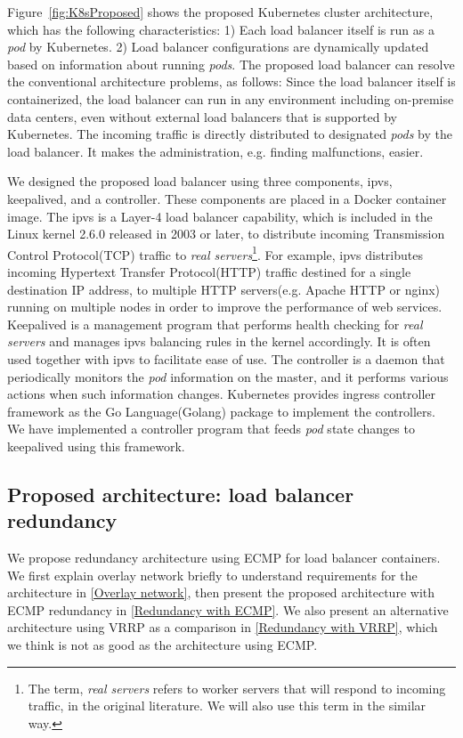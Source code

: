 Figure~\ref{fig:K8sProposed} shows the proposed  Kubernetes cluster architecture, 
which has the following characteristics:
1) Each load balancer itself is run as a {\em pod} by Kubernetes. 
2) Load balancer configurations are dynamically updated based on information about running {\em pods}.
The proposed load balancer can resolve the conventional architecture problems, as follows:
Since the load balancer itself is containerized, the load balancer can run in any environment including on-premise data centers, 
even without external load balancers that is supported by Kubernetes.
The incoming traffic is directly distributed to designated {\em pods} by the load balancer. 
It makes the administration, e.g. finding malfunctions, easier.

We designed the proposed load balancer using three components, ipvs, keepalived, and a controller. 
These components are placed in a Docker container image.
The ipvs is a Layer-4 load balancer capability, which is included in the Linux kernel 2.6.0 released in 2003 or later, 
to distribute incoming Transmission Control Protocol(TCP) traffic to 
{\em real servers}\footnote{The term, {\em real servers} refers to worker servers that will respond to incoming traffic, 
in the original literature\cite{Zhang2000}. We will also use this term in the similar way.}\cite{Zhang2000}. 
For example, ipvs distributes incoming Hypertext Transfer Protocol(HTTP) traffic destined for a single destination IP address, 
to multiple HTTP servers(e.g. Apache HTTP or nginx) running on multiple nodes in order to improve the performance of web services.
Keepalived is a management program that performs health checking for {\em real servers}
and manages ipvs balancing rules in the kernel accordingly.
It is often used together with ipvs to facilitate ease of use.
The controller is a daemon that periodically monitors the {\em pod} information on the master, 
and it performs various actions when such information changes.
Kubernetes provides ingress controller framework as the Go Language(Golang) package to implement the controllers. 
We have implemented a controller program that feeds {\em pod} state changes to keepalived 
using this framework. 

\subsection{Proposed architecture: load balancer redundancy}

We propose redundancy architecture using ECMP for load balancer containers. 
We first explain overlay network briefly to understand requirements for the architecture in \ref{Overlay network}, then present the proposed architecture with ECMP redundancy in \ref{Redundancy with ECMP}. 
We also present an alternative architecture using VRRP as a comparison in \ref{Redundancy with VRRP}, which we think is not as good as the architecture using ECMP. 


